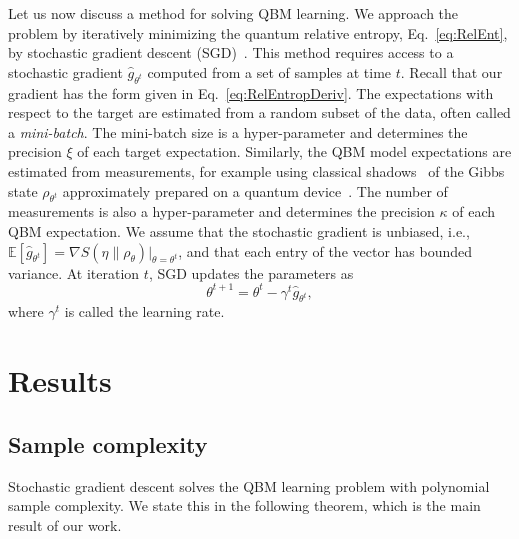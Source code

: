 \documentclass[
    reprint,
    aps,
    prx,
    longbibliography
]{revtex4-2}
\begin{document}
Let us now discuss a method for solving QBM learning. We approach the problem by iteratively minimizing the quantum relative entropy,  Eq.~\eqref{eq:RelEnt}, by stochastic gradient descent (SGD)~\cite{Garrigos2023}. This method requires access to a stochastic gradient $\hat{g}_{\theta^t}$ computed from a set of samples at time $t$. Recall that our gradient has the form given in Eq.~\eqref{eq:RelEntropDeriv}. The expectations with respect to the target are estimated from a random subset of the data, often called a \emph{mini-batch}. The mini-batch size is a hyper-parameter and determines the precision $\xi$ of each target expectation. Similarly, the QBM model expectations are estimated from measurements, for example using classical shadows~\cite{Aaronson_2017, Huang_2021} of the Gibbs state $\rho_{\theta^t}$ approximately prepared on a quantum device~\cite{Coopmans_2023}. The number of measurements is also a hyper-parameter and determines the precision $\kappa$ of each QBM expectation. We assume that the stochastic gradient is unbiased, i.e., $\mathbb{E}[\hat{g}_{\theta^t}] = \nabla S(\eta \|\rho_\theta)|_{\theta = \theta^t}$, and that each entry of the vector has bounded variance. At iteration $t$, SGD updates the parameters as 
\begin{equation}
\label{eq:sgd_update}
    \theta^{t+1} = \theta^{t} - \gamma^{t} \hat{g}_{\theta^{t}},
\end{equation} 
where $\gamma^t$ is called the learning rate.

\section*{Results}

\subsection*{Sample complexity}

Stochastic gradient descent solves the QBM learning problem with polynomial sample complexity. We state this in the following theorem, which is the main result of our work.
\end{document}

